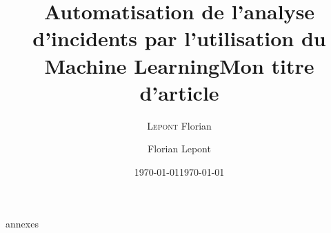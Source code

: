 \documentclass[a4paper,10pt]{report}
\title{Automatisation de l'analyse d'incidents par l'utilisation du Machine Learning}
\author{\textsc{Lepont} Florian}
\date{\today}
\title{Mon titre d'article}
\date{\today}
\author{Florian Lepont}
\begin{document}
	
\maketitle


\tableofcontents
\listoffigures
\listoftables
\printindex





 {annexes}
\end{document}
